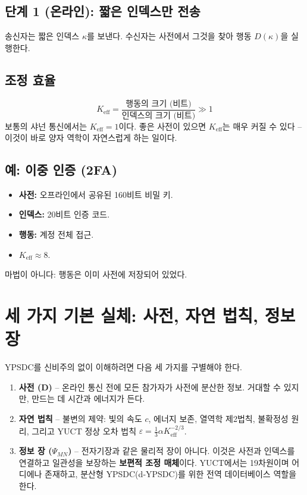 \documentclass[12pt,a4paper]{article}
\begin{document}
	\subsection{단계 1 (온라인): 짧은 인덱스만 전송}
	송신자는 짧은 인덱스 \(\kappa\)를 보낸다. 수신자는 사전에서 그것을 찾아 행동 \(D(\kappa)\)을 실행한다.
	
	\subsection{조정 효율}
	\[
	K_{\mathrm{eff}} = \frac{\text{행동의 크기 (비트)}}{\text{인덱스의 크기 (비트)}} \gg 1
	\]
	보통의 샤넌 통신에서는 \(K_{\mathrm{eff}}=1\)이다. 좋은 사전이 있으면 \(K_{\mathrm{eff}}\)는 매우 커질 수 있다 – 이것이 바로 양자 역학이 자연스럽게 하는 일이다.
	
	\subsection{예: 이중 인증 (2FA)}
	\begin{itemize}
		\item \textbf{사전:} 오프라인에서 공유된 160비트 비밀 키.
		\item \textbf{인덱스:} 20비트 인증 코드.
		\item \textbf{행동:} 계정 전체 접근.
		\item \(K_{\mathrm{eff}} \approx 8\).
	\end{itemize}
	마법이 아니다: 행동은 이미 사전에 저장되어 있었다.
	
	\section{세 가지 기본 실체: 사전, 자연 법칙, 정보 장}
	
	YPSDC를 신비주의 없이 이해하려면 다음 세 가지를 구별해야 한다.
	
	\begin{enumerate}
		\item \textbf{사전 (D)} – 온라인 통신 전에 모든 참가자가 사전에 분산한 정보. 거대할 수 있지만, 만드는 데 시간과 에너지가 든다.
		\item \textbf{자연 법칙} – 불변의 제약: 빛의 속도 \(c\), 에너지 보존, 열역학 제2법칙, 불확정성 원리, 그리고 YUCT 정상 오차 법칙 \(\varepsilon = \frac13 \alpha K_{\mathrm{eff}}^{-2/3}\).
		\item \textbf{정보 장 (\(\Psi_{MN}\))} – 전자기장과 같은 물리적 장이 아니다. 이것은 사전과 인덱스를 연결하고 일관성을 보장하는 \textbf{보편적 조정 매체}이다. YUCT에서는 19차원이며 어디에나 존재하고, 분산형 YPSDC(d‑YPSDC)를 위한 전역 데이터베이스 역할을 한다.
	\end{enumerate}
	
\end{document}
